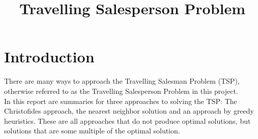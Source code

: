 \documentclass{article}
\title{Travelling Salesperson Problem}
\begin{document}
  \maketitle
  \section{Introduction}
  There are many ways to approach the Travelling Salesman Problem (TSP), otherwise referred to as the Travelling Salesperson Problem in this project.\\

  In this report are summaries for three approaches to solving the TSP: The Christofides approach, the nearest neighbor solution and an approach by greedy heuristics. These are all approaches that do not produce optimal solutions, but solutions that are some multiple of the optimal solution.

  

  

  

  {}
  
\end{document}
